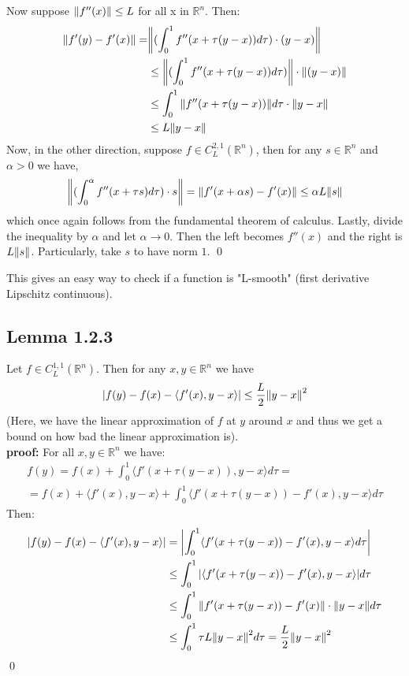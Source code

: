 \documentclass[12pt,a4paper]{article}
\begin{document}
	Now suppose $\norm{f''(x)} \leq L$ for all x in $\mathbb{R}^n$. Then:
	\begin{align*}
		\norm{f'(y) - f'(x)} =&
			 \norm{(\int_{0}^{1}f''(x + \tau(y-x))d\tau)\cdot (y-x)} \\
			 &\leq \norm{(\int_{0}^{1}f''(x + \tau(y-x))d\tau)}\cdot \norm{(y-x)} \\
			 &\leq \int_{0}^{1}\norm{f''(x + \tau(y-x))}d\tau \cdot \norm{y-x} \\
			 &\leq L \norm{y-x}
	\end{align*}
	Now, in the other direction, suppose $f \in C_L^{2,1}(\mathbb{R}^n)$, then for any $s \in \mathbb{R}^n$ and $\alpha>0$ we have,
	\begin{align*}
		\norm{(\int_{0}^{\alpha} f''(x+\tau s)d\tau) \cdot s } = \norm{f'(x+\alpha s) - f'(x)} \leq \alpha L \norm{s}
	\end{align*}
	which once again follows from the fundamental theorem of calculus. Lastly, divide the inequality by $\alpha$ and let $\alpha \rightarrow 0$. Then the left becomes $f''(x)$ and the right is $L\norm{s}$. Particularly, take $s$ to have norm $1$. \qed
	
	This gives an easy way to check if a function is "L-smooth" (first derivative Lipschitz continuous).
	
	\subsection*{Lemma 1.2.3}\label{lem123}
	Let $f \in C_L^{1,1}(\mathbb{R}^n)$. Then for any $x,y \in \mathbb{R}^n$ we have
	\begin{align*}
		\abs{f(y) - f(x) - \langle f'(x),y-x \rangle} \leq \frac{L}{2}\norm{y-x}^2
	\end{align*}
	(Here, we have the linear approximation of $f$ at $y$ around $x$ and thus we get a bound on how bad the linear approximation is).\\
	\textbf{proof:} For all $x,y \in \mathbb{R}^n$ we have:
	\begin{align*}
		f(y) = f(x) + \int_{0}^{1}\langle f'(x + \tau(y-x)), y-x \rangle d\tau = \\
		= f(x) + \langle f'(x),y-x \rangle + \int_{0}^{1}\langle f'(x + \tau(y-x)) - f'(x), y-x \rangle d\tau 
	\end{align*}
	Then:
	\begin{align*}
		\abs{f(y) - f(x) - \langle f'(x),y-x\rangle} &= \abs{\int_{0}^{1} \langle f'(x + \tau(y-x)) - f'(x),y-x \rangle d\tau} \\
		&\leq \int_{0}^{1} \abs{\langle f'(x + \tau(y-x)) - f'(x),y-x \rangle} d\tau \\
		&\leq \int_{0}^{1}\norm{f'(x + \tau(y-x)) - f'(x)} \cdot \norm{y-x}d\tau \\
		&\leq \int_{0}^{1}\tau L \norm{y-x}^2 d\tau = \frac{L}{2}\norm{y-x}^2
	\end{align*}
	\qed
	
\end{document}
